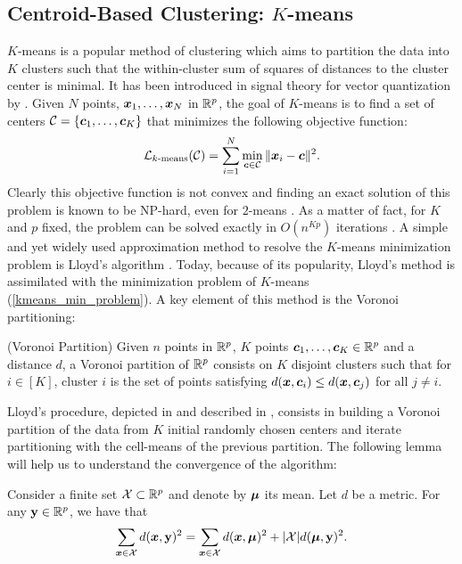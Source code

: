 \subsection{Centroid-Based Clustering: $K$-means}
$K$-means is a popular method of clustering which aims to partition the data into $K$ clusters such that the within-cluster sum of squares of distances to the cluster center is minimal. It has been introduced in signal theory for vector quantization by \citep{macqueen1967}. Given $N$ points, $\boldsymbol x_1,\dots,\boldsymbol x_N$ in ${\mathbb R}^p$, the goal of $K$-means is to find a set of centers $\mathcal{C}=\{\boldsymbol c_1,\dots,\boldsymbol c_K\}$ that minimizes the following objective function:
\begin{equation}
  \mathcal{L}_{k\textnormal{-means}}(\mathcal{C})=\sum_{i=1}^N\min_{\boldsymbol c \in \mathcal{C}}\|\boldsymbol x_i - \boldsymbol c \|^2.
  \label{kmeans_min_problem}
\end{equation}
Clearly this objective function is not convex and finding an exact solution of this problem is known to be NP-hard, even for $2$-means \citep{dasgupta2008hardness,Aloise:2009:NES:1519378.1519389}. As a matter of fact, for $K$ and $p$ fixed, the problem can be solved exactly in $O(n^{Kp})$ iterations \citep{Inaba:1994:AWV:177424.178042}. A simple and yet widely used approximation method to resolve the $K$-means minimization problem is Lloyd's algorithm \citep{lloyd1982}. Today, because of its popularity, Lloyd's method is assimilated with the minimization problem of $K$-means (\cref{kmeans_min_problem}). A key element of this method is the Voronoi partitioning:
\begin{defi}{(Voronoi Partition)} 
Given $n$ points in ${\mathbb R}^p$, $K$ points $\boldsymbol c_1,\dots,\boldsymbol c_K\in {\mathbb R}^p$ and a distance $d$, a Voronoi partition of ${\mathbb R}^p$ consists on $K$ disjoint clusters such that for $i\in[K]$, cluster $i$ is the set of points satisfying $d(\boldsymbol x, \boldsymbol c_i) \leq d(\boldsymbol x, \boldsymbol c_j)$ for all $j\neq i$.
\end{defi}
Lloyd's procedure, depicted in  and described in , consists in building a Voronoi partition of the data from $K$ initial randomly chosen centers and iterate partitioning with the cell-means of the previous partition. The following lemma will help us to understand the convergence of the algorithm:
\begin{lemma}
Consider a finite set $\mathcal{X} \subset{\mathbb R}^p$ and denote by $\boldsymbol\mu$ its mean. Let $d$ be a metric. For any $\mathbf y\in {\mathbb R}^p$, we have that 
\begin{equation}
  \sum_{\boldsymbol x \in \mathcal{X}} d(\boldsymbol x,\mathbf y)^2 = \sum_{\boldsymbol x\in\mathcal{X}}d(\boldsymbol x,\boldsymbol\mu)^2 + |\mathcal{X}|d(\boldsymbol\mu,\mathbf y)^2.
\end{equation}
\label{lemma_lloyd_decr_cost}
\end{lemma}
